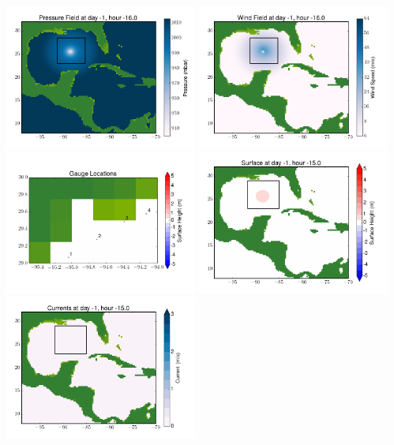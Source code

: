 \documentclass[11pt]{article}
\begin{document}
\includegraphics[width=0.475\textwidth]{frame0032fig8.png}
\vskip 10pt 
\includegraphics[width=0.475\textwidth]{frame0032fig9.png}
\includegraphics[width=0.475\textwidth]{frame0032fig10.png}
\vskip 10pt 
\includegraphics[width=0.475\textwidth]{frame0033fig1.png}
\includegraphics[width=0.475\textwidth]{frame0033fig2.png}
\end{document}
